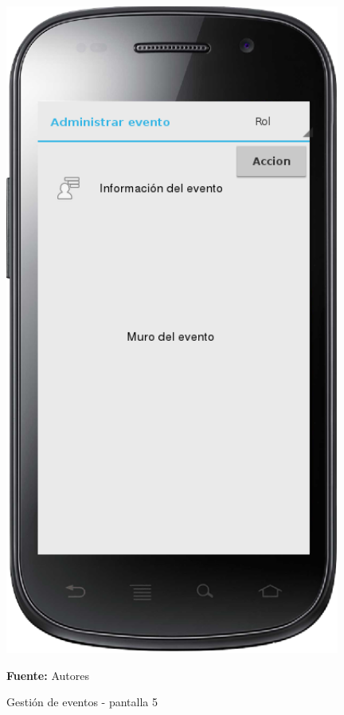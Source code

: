 \begin{figure}[!htb]
  \begin{center}
    \includegraphics[width=11cm]{./imagenes/UI/Eventos/gestion_eventos_5.png}
    \caption{Gestión de eventos - pantalla 5}
    \label{fig:gestion_eventos_5}
    \textbf{Fuente:}  Autores
  \end{center}
\end{figure}

